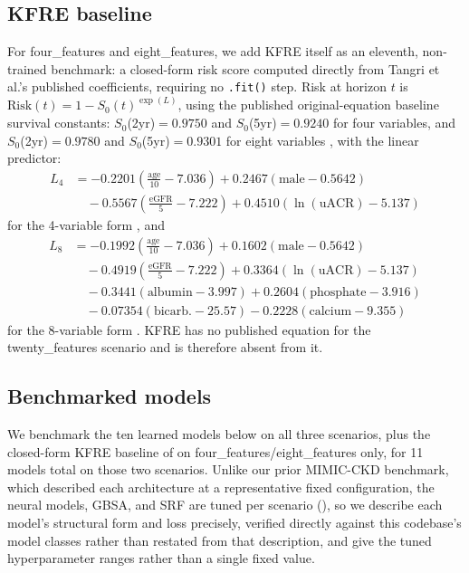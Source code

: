 \documentclass[10pt,letterpaper]{article}
\begin{document}
\subsection*{KFRE baseline} \label{sec:kfre}
For four\_features and eight\_features, we add KFRE itself as an eleventh, non-trained benchmark: a closed-form risk score computed directly from Tangri et al.'s published coefficients, requiring no \texttt{.fit()} step. Risk at horizon $t$ is $\mathrm{Risk}(t) = 1 - S_0(t)^{\exp(L)}$, using the published original-equation baseline survival constants: $S_0$(2yr)$=0.9750$ and $S_0$(5yr)$=0.9240$ for four variables, and $S_0$(2yr)$=0.9780$ and $S_0$(5yr)$=0.9301$ for eight variables \cite{tangri2016multinational}, with the linear predictor:
\begin{align}
L_4 &= -0.2201\left(\tfrac{\text{age}}{10}-7.036\right) + 0.2467(\text{male}-0.5642) \nonumber\\
&\quad -0.5567\left(\tfrac{\text{eGFR}}{5}-7.222\right) + 0.4510\left(\ln(\text{uACR})-5.137\right)
\end{align}
for the 4-variable form \cite{tangri2011predicting}, and
\begin{align}
L_8 &= -0.1992\left(\tfrac{\text{age}}{10}-7.036\right) + 0.1602(\text{male}-0.5642) \nonumber \\
&\quad -0.4919\left(\tfrac{\text{eGFR}}{5}-7.222\right) + 0.3364\left(\ln(\text{uACR})-5.137\right) \nonumber \\
&\quad -0.3441(\text{albumin}-3.997) + 0.2604(\text{phosphate}-3.916) \nonumber \\
&\quad -0.07354(\text{bicarb.}-25.57) -0.2228(\text{calcium}-9.355)
\end{align}
for the 8-variable form \cite{tangri2011predicting}. KFRE has no published equation for the twenty\_features scenario and is therefore absent from it.

\subsection*{Benchmarked models} \label{sec:models}
We benchmark the ten learned models below on all three scenarios, plus the closed-form KFRE baseline of  on four\_features/eight\_features only, for 11 models total on those two scenarios. Unlike our prior MIMIC-CKD benchmark, which described each architecture at a representative fixed configuration, the neural models, GBSA, and SRF are tuned per scenario (), so we describe each model's structural form and loss precisely, verified directly against this codebase's model classes rather than restated from that description, and give the tuned hyperparameter ranges rather than a single fixed value.
\end{document}
